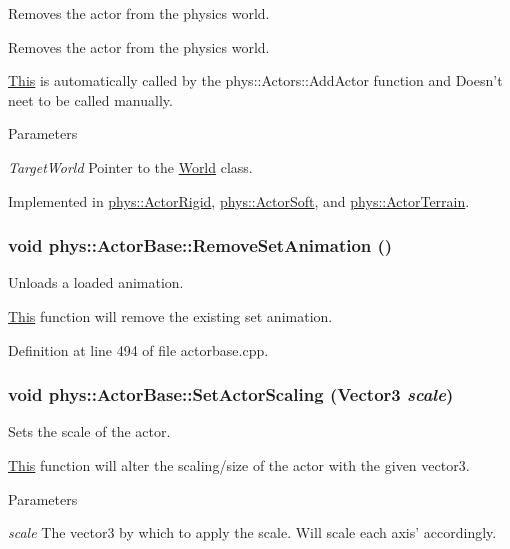 Removes the actor from the physics world. 

Removes the actor from the physics world. \par
 \hyperlink{structThis}{This} is automatically called by the phys::Actors::AddActor function and Doesn't neet to be called manually. 
\begin{DoxyParams}{Parameters}
\item[{\em TargetWorld}]Pointer to the \hyperlink{classphys_1_1World}{World} class. \end{DoxyParams}


Implemented in \hyperlink{classphys_1_1ActorRigid_a7101df2a149e0ccb3678b7c2c00998f8}{phys::ActorRigid}, \hyperlink{classphys_1_1ActorSoft_ab65d106fcc1ee5243a990e7b42326bf0}{phys::ActorSoft}, and \hyperlink{classphys_1_1ActorTerrain_aeded1fdabfc4dd407f81fcc5b97c1f77}{phys::ActorTerrain}.

\hypertarget{classphys_1_1ActorBase_ac42e5e47504d7f296bb0a2bedc2ded07}{
\subsubsection[{RemoveSetAnimation}]{\setlength{\rightskip}{0pt plus 5cm}void phys::ActorBase::RemoveSetAnimation ()}}
\label{d8/d0f/classphys_1_1ActorBase_ac42e5e47504d7f296bb0a2bedc2ded07}


Unloads a loaded animation. 

\hyperlink{structThis}{This} function will remove the existing set animation. 

Definition at line 494 of file actorbase.cpp.

\hypertarget{classphys_1_1ActorBase_a1ac7c692d7f88f39ebb1c1db5deba251}{
\subsubsection[{SetActorScaling}]{\setlength{\rightskip}{0pt plus 5cm}void phys::ActorBase::SetActorScaling ({\bf Vector3} {\em scale})}}
\label{d8/d0f/classphys_1_1ActorBase_a1ac7c692d7f88f39ebb1c1db5deba251}


Sets the scale of the actor. 

\hyperlink{structThis}{This} function will alter the scaling/size of the actor with the given vector3. 
\begin{DoxyParams}{Parameters}
\item[{\em scale}]The vector3 by which to apply the scale. Will scale each axis' accordingly. \end{DoxyParams}


